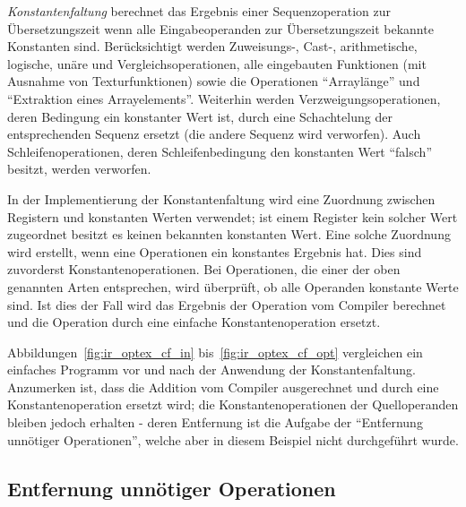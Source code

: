 \documentclass[twoside,a4paper,fleqn,12pt]{book}
\begin{document}
\emph{Konstantenfaltung} berechnet das Ergebnis einer Sequenzoperation zur Übersetzungszeit
wenn alle Eingabeoperanden zur Übersetzungszeit bekannte Konstanten sind. Berücksichtigt
werden Zuweisungs-, Cast-, arithmetische, logische, unäre und Vergleichsoperationen, alle eingebauten
Funktionen (mit Ausnahme von Texturfunktionen) sowie die Operationen "`Arraylänge"' und
"`Extraktion eines Arrayelements"'.
Weiterhin werden Verzweigungsoperationen, deren Bedingung ein konstanter Wert ist,
durch eine Schachtelung der entsprechenden Sequenz ersetzt (die andere Sequenz wird verworfen).
Auch Schleifenoperationen, deren Schleifenbedingung den konstanten Wert "`falsch"' besitzt,
werden verworfen.

In der Implementierung der Konstantenfaltung wird eine Zuordnung zwischen Registern und konstanten
Werten verwendet; ist einem Register kein solcher Wert zugeordnet besitzt es keinen bekannten
konstanten Wert. Eine solche Zuordnung wird erstellt, wenn eine Operationen ein konstantes
Ergebnis hat. Dies sind zuvorderst Konstantenoperationen.
Bei Operationen, die einer der oben genannten Arten entsprechen, wird überprüft, ob alle Operanden
konstante Werte sind. Ist dies der Fall wird das Ergebnis der Operation vom Compiler berechnet
und die Operation durch eine einfache Konstantenoperation ersetzt.


Abbildungen~\ref{fig:ir_optex_cf_in} bis~\ref{fig:ir_optex_cf_opt} vergleichen ein einfaches Programm vor und nach der Anwendung der Konstantenfaltung.
Anzumerken ist, dass die Addition vom Compiler ausgerechnet und durch eine Konstantenoperation ersetzt
wird; die Konstantenoperationen der Quelloperanden bleiben jedoch erhalten - deren Entfernung ist
die Aufgabe der "`Entfernung unnötiger Operationen"', welche aber in diesem Beispiel nicht durchgeführt wurde.


\subsection{Entfernung unnötiger Operationen}
\end{document}
